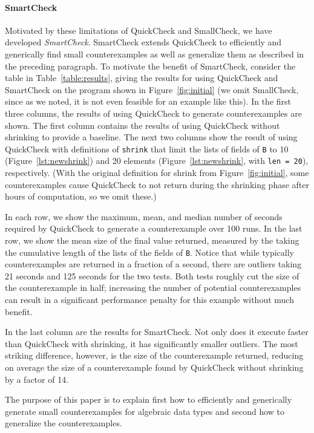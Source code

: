 \documentclass[10pt]{sigplanconf}
\newcommand{\ttp}[1]{\texttt{#1}}
\begin{document}
\paragraph{SmartCheck}
Motivated by these limitations of QuickCheck and SmallCheck, we have developed
\emph{SmartCheck}.  SmartCheck extends QuickCheck to efficiently and generically
find small counterexamples as well as generalize them as described in the
preceding paragraph.  To motivate the benefit of SmartCheck, consider the table
in Table~\ref{table:results}, giving the results for using QuickCheck and
SmartCheck on the program shown in Figure~\ref{fig:initial} (we omit SmallCheck,
since as we noted, it is not even feasible for an example like this).  In the
first three columns, the results of using QuickCheck to generate counterexamples
are shown.  The first column contains the results of using QuickCheck without
shrinking to provide a baseline.  The next two columns show the result of using
QuickCheck with definitions of \ttp{shrink} that limit the lists of fields of
\ttp{B} to 10 (Figure~\ref{lst:newshrink}) and 20 elements
(Figure~\ref{lst:newshrink}, with \ttp{len = 20}), respectively.  (With the
original definition for shrink from Figure~\ref{fig:initial}, some
counterexamples cause QuickCheck to not return during the shrinking phase after
hours of computation, so we omit these.)

  In each row, we show the maximum, mean, and median
number of seconds required by QuickCheck to generate a counterexample over 100
runs.  In the last row, we show the mean size of the final value returned,
measured by the taking the cumulative length of the lists of the fields of
\ttp{B}.  Notice that while typically counterexamples are returned in a fraction
of a second, there are outliers taking 21 seconds and 125 seconds for the two
tests.  Both tests roughly cut the size of the counterexample in half;
increasing the number of potential counterexamples can result in a significant
performance penalty for this example without much benefit.

In the last column are the results for SmartCheck.  Not only does it execute
faster than QuickCheck with shrinking, it has significantly smaller outliers.
The most striking difference, however, is the size of the counterexample
returned, reducing on average the size of a counterexample found by QuickCheck
without shrinking by a factor of 14.

The purpose of this paper is to explain first how to efficiently and generically
generate small counterexamples for algebraic data types and second how to
generalize the counterexamples.
\end{document}
